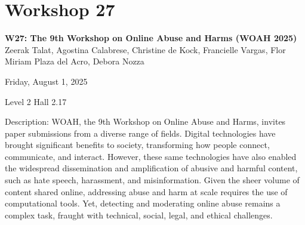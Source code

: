 \clearpage


\section[W27: The 9th Workshop on Online Abuse and Harms (WOAH 2025) ]{Workshop 27}
\label{workshop_27}

\begin{center}
    {\Large \textbf{W27: The 9th Workshop on Online Abuse and Harms (WOAH 2025) }}\\
    

Zeerak Talat, Agostina Calabrese, Christine de Kock, Francielle Vargas, Flor Miriam Plaza del Acro, Debora Nozza

    Friday, August 1, 2025

Level 2 Hall 2.17

\end{center}

Description: WOAH, the 9th Workshop on Online Abuse and Harms, invites paper submissions from a diverse range of fields. Digital technologies have brought significant benefits to society, transforming how people connect, communicate, and interact. However, these same technologies have also enabled the widespread dissemination and amplification of abusive and harmful content, such as hate speech, harassment, and misinformation. Given the sheer volume of content shared online, addressing abuse and harm at scale requires the use of computational tools. Yet, detecting and moderating online abuse remains a complex task, fraught with technical, social, legal, and ethical challenges. 

